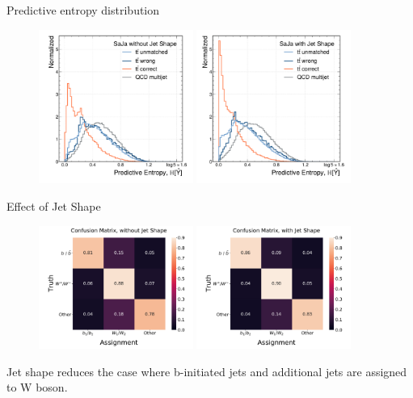 \begin{frame}[fragile]{Predictive entropy distribution}
    \begin{figure}
        \centering
        \includegraphics[width=0.45\textwidth]{fig/entropy/entropy-without-jet-shape.pdf}
        \includegraphics[width=0.45\textwidth]{fig/entropy/entropy-with-jet-shape.pdf}
    \end{figure}
\end{frame}

\begin{frame}[fragile]{Effect of Jet Shape}
    \begin{figure}
        \centering
        \includegraphics[width=0.45\textwidth]{fig/confusion-matrix/confusion_matrix_without_jet_shape.pdf}
        \includegraphics[width=0.45\textwidth]{fig/confusion-matrix/confusion_matrix_with_jet_shape.pdf}
    \end{figure}
    Jet shape reduces the case where b-initiated jets and additional jets are assigned to W boson.
\end{frame}


